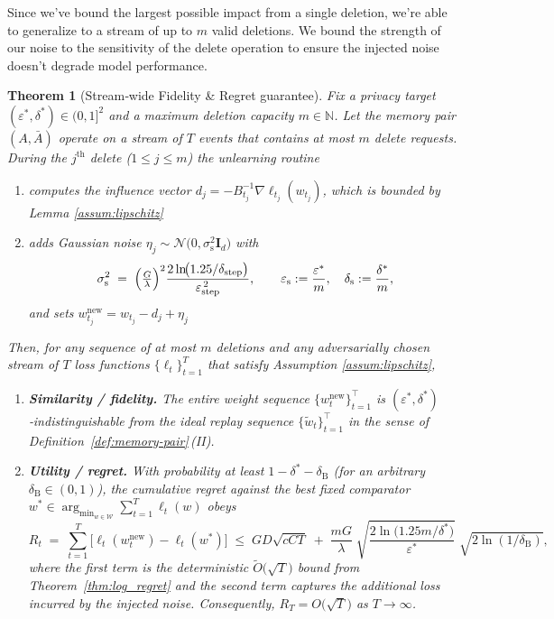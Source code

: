 \documentclass{article}
\theoremstyle{ssltheorem}
\newtheorem{theorem}{Theorem}
\begin{document}
Since we've bound the largest possible impact from a single deletion, we're able to generalize to a stream of up to $m$ valid deletions.
We bound the strength of our noise to the sensitivity of the delete operation to ensure the injected noise doesn't degrade model performance.
\begin{theorem}[Stream‑wide Fidelity \& Regret guarantee]
\label{thm:comp-fidelity-regret}
Fix a privacy target $(\varepsilon^{*},\delta^{*})\in(0,1]^{2}$ and a maximum deletion capacity $m\in\mathbb{N}$. Let the memory pair $(A,\bar{A})$ operate on a stream of $T$ events that contains at most $m$ delete requests. During the $j^{\text{th}}$ delete ($1\le j\le m$) the unlearning routine

\begin{enumerate}
    \item computes the influence vector $d_{j} = -B_{t_{j}}^{-1}\nabla \ell_{t_{j}}(w_{t_{j}})$, which is bounded by Lemma \ref{assum:lipschitz}
    \item adds Gaussian noise $\eta_{j}\sim\mathcal N\!\bigl(0,\sigma_{\text{s}}^{2}\mathbf I_{d}\bigr)$ with 
    $$
    \sigma_{\text{s}}^{2}
    \;=\;
    \Bigl(\tfrac{G}{\lambda}\Bigr)^{2}
    \frac{2\ln\!\bigl(1.25/\delta_{\text{step}}\bigr)}
  {\varepsilon_{\text{step}}^{\,2}},
    \qquad
    \varepsilon_{\text{s}}:=\frac{\varepsilon^*}{m},
    \quad
    \delta_{\text{s}}:=\frac{\delta^*}{m},
    $$
    and sets $w_{t_{j}}^{\text{new}} = w_{t_{j}}-d_{j}+\eta_{j}$
\end{enumerate}

Then, for \emph{any} sequence of at most $m$ deletions and \emph{any}
adversarially chosen stream of $T$ loss functions
$\{\ell_{t}\}_{t=1}^{T}$ that satisfy Assumption \ref{assum:lipschitz},

\begin{enumerate}
\item \textbf{Similarity / fidelity.}  
      The entire weight sequence $\{w_{t}^{\text{new}}\}_{t=1}^{\top}$
      is $(\varepsilon^*,\delta^*)$‑indistinguishable
      from the ideal replay sequence
      $\{\tilde w_{t}\}_{t=1}^{\top}$ in the sense of
      Definition~\ref{def:memory-pair}\,(II).
\item \textbf{Utility / regret.}  
      With probability at least
      $1-\delta^*-\delta_{\mathrm{B}}$ (for an arbitrary
      $\delta_{\mathrm{B}}\!\in\!(0,1)$),
      the cumulative regret against the best fixed comparator
      $w^{*}\in\arg_{\min_{w\in\mathcal W}}\sum_{t=1}^{T}\ell_{t}(w)$ obeys
      $$
        R_{t}
        \;=\;
\sum_{t=1}^{T}\bigl[\ell_{t}(w_{t}^{\text{new}})-\ell_{t}(w^{*})\bigr]
        \;\le\;
        GD\sqrt{cCT}
        \;+\;
        \frac{mG}{\lambda}\;
\sqrt{\frac{2\ln\!\bigl(1.25m/\delta^{*}\bigr)}%
                   {\varepsilon^{*}}}\;
\sqrt{2\ln(1/\delta_{\mathrm{B}})},
      $$
      where the first term is the deterministic
      $\tilde O\!\bigl(\sqrt{T}\bigr)$ bound from
      Theorem~\ref{thm:log_regret} and the second term captures the
      additional loss incurred by the injected noise.
Consequently, $R_{T} = O\!\bigl(\sqrt{T}\bigr)$ as
      $T\!\to\!\infty$.
\end{enumerate}
\end{theorem}
\end{document}
